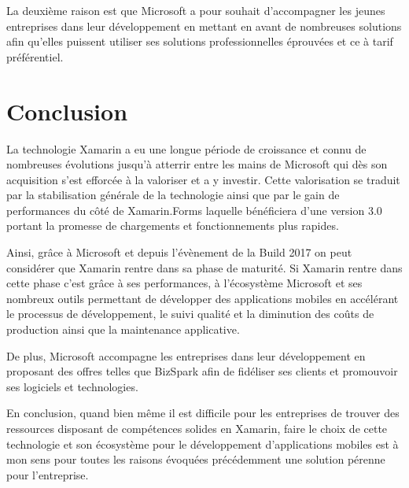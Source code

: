 \documentclass[11]{article}
\begin{document}
\vspace{0.5cm}

La deuxième raison est que Microsoft a pour souhait d’accompagner les jeunes entreprises dans leur développement en mettant en avant de nombreuses solutions afin qu’elles puissent utiliser ses solutions professionnelles éprouvées et ce à tarif préférentiel.

 \part{Conclusion}
La technologie Xamarin a eu une longue période de croissance et connu de nombreuses évolutions jusqu’à atterrir entre les mains de Microsoft qui dès son acquisition s’est efforcée à la valoriser et a y investir.  Cette valorisation se traduit par la stabilisation générale de la technologie ainsi que par le gain de performances du côté de Xamarin.Forms laquelle bénéficiera d’une version 3.0 portant la promesse de chargements et fonctionnements plus rapides.

 \vspace{0.5cm}

Ainsi, grâce à Microsoft et depuis l’évènement de la Build 2017 on peut considérer que Xamarin rentre dans sa phase de maturité. Si Xamarin rentre dans cette phase c’est grâce à ses performances, à l’écosystème Microsoft et ses nombreux outils permettant de développer des applications mobiles en accélérant le processus de développement, le suivi qualité et la diminution des coûts de production ainsi que la maintenance applicative.

\vspace{0.5cm}
 
De plus, Microsoft accompagne les entreprises dans leur développement en proposant des offres telles que BizSpark afin de fidéliser ses clients et promouvoir ses logiciels et technologies.

\vspace{0.5cm}
 
En conclusion, quand bien même il est difficile pour les entreprises de trouver des ressources disposant de compétences solides en Xamarin, faire le choix de cette technologie et son écosystème pour le développement d’applications mobiles est à mon sens pour toutes les raisons évoquées précédemment une solution pérenne pour l’entreprise.


 
 
 
 
 
 
\end{document}

